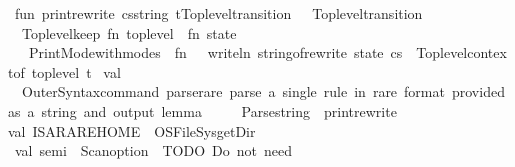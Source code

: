 \begin{isabellebody}
\isanewline
\ fun\ print{\isacharunderscore}{\kern0pt}rewrite\ {\isacharparenleft}{\kern0pt}cs{\isacharcolon}{\kern0pt}string{\isacharparenright}{\kern0pt}\ {\isacharparenleft}{\kern0pt}t{\isacharcolon}{\kern0pt}Toplevel{\isachardot}{\kern0pt}transition{\isacharparenright}{\kern0pt}\ {\isacharcolon}{\kern0pt}\ \ Toplevel{\isachardot}{\kern0pt}transition\ {\isacharequal}{\kern0pt}\isanewline
\ \ Toplevel{\isachardot}{\kern0pt}keep\ {\isacharparenleft}{\kern0pt}fn\ toplevel\ {\isacharequal}{\kern0pt}{\isachargreater}{\kern0pt}\ {\isacharparenleft}{\kern0pt}fn\ state\ {\isacharequal}{\kern0pt}{\isachargreater}{\kern0pt}\isanewline
\ \ \ Print{\isacharunderscore}{\kern0pt}Mode{\isachardot}{\kern0pt}with{\isacharunderscore}{\kern0pt}modes\ {\isacharbrackleft}{\kern0pt}{\isacharbrackright}{\kern0pt}\ {\isacharparenleft}{\kern0pt}fn\ {\isacharparenleft}{\kern0pt}{\isacharparenright}{\kern0pt}\ {\isacharequal}{\kern0pt}{\isachargreater}{\kern0pt}\ writeln\ {\isacharparenleft}{\kern0pt}string{\isacharunderscore}{\kern0pt}of{\isacharunderscore}{\kern0pt}rewrite\ state\ cs{\isacharparenright}{\kern0pt}{\isacharparenright}{\kern0pt}\ {\isacharparenleft}{\kern0pt}{\isacharparenright}{\kern0pt}{\isacharparenright}{\kern0pt}\ {\isacharparenleft}{\kern0pt}Toplevel{\isachardot}{\kern0pt}context{\isacharunderscore}{\kern0pt}of\ toplevel{\isacharparenright}{\kern0pt}{\isacharparenright}{\kern0pt}\ t\isanewline
\isanewline
\ val\ {\isacharunderscore}{\kern0pt}\ {\isacharequal}{\kern0pt}\isanewline
\ \ Outer{\isacharunderscore}{\kern0pt}Syntax{\isachardot}{\kern0pt}command\ \isactrlcommandUNDERSCOREkeyword {\isasymopen}parse{\isacharunderscore}{\kern0pt}rare{\isasymclose}\ {\isachardoublequote}{\kern0pt}parse\ a\ single\ rule\ in\ rare\ format\ {\isacharparenleft}{\kern0pt}provided\ as\ a\ string{\isacharparenright}{\kern0pt}\ and\ output\ lemma{\isachardoublequote}{\kern0pt}\isanewline
\ \ \ \ {\isacharparenleft}{\kern0pt}\ Parse{\isachardot}{\kern0pt}string\ {\isachargreater}{\kern0pt}{\isachargreater}{\kern0pt}\ print{\isacharunderscore}{\kern0pt}rewrite{\isacharparenright}{\kern0pt}{\isacharsemicolon}{\kern0pt}\isanewline
\isanewline
val\ ISARARE{\isacharunderscore}{\kern0pt}HOME\ {\isacharequal}{\kern0pt}\ OS{\isachardot}{\kern0pt}FileSys{\isachardot}{\kern0pt}getDir{\isacharparenleft}{\kern0pt}{\isacharparenright}{\kern0pt}\isanewline
\isanewline
\ val\ semi\ {\isacharequal}{\kern0pt}\ Scan{\isachardot}{\kern0pt}option\ \isactrlkeyword {\isasymopen}{\isacharsemicolon}{\kern0pt}{\isasymclose}{\isacharsemicolon}{\kern0pt}\ {\isacharparenleft}{\kern0pt}{\isacharasterisk}{\kern0pt}TODO{\isacharcolon}{\kern0pt}\ Do\ not\ need{\isacharquery}{\kern0pt}{\isacharasterisk}{\kern0pt}{\isacharparenright}{\kern0pt}\isanewline

\end{isabellebody}
